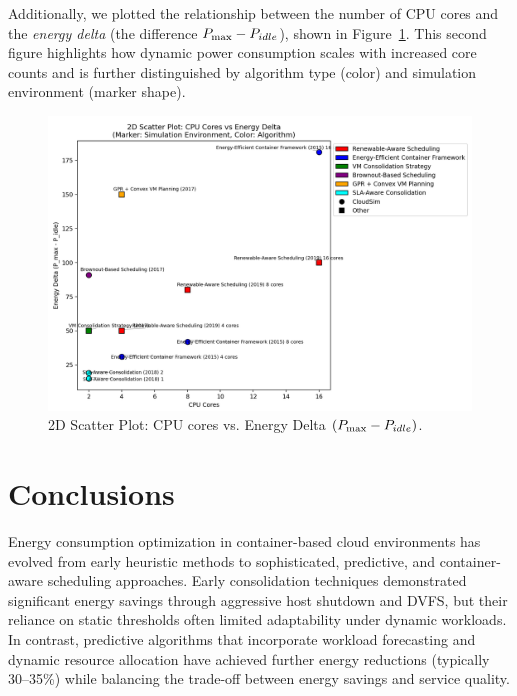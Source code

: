 \documentclass[runningheads]{llncs}
\begin{document}
Additionally, we plotted the relationship between the number of CPU cores and the \textit{energy delta} (the difference $P_{\max} - P_{\begin{footnotesize}idle \end{footnotesize}}$), shown in Figure~\ref{fig:energy_delta}. This second figure highlights how dynamic power consumption scales with increased core counts and is further distinguished by algorithm type (color) and simulation environment (marker shape).

\begin{figure}[H]
    \centering
    \includegraphics[width=0.75\columnwidth]{Energy.png}
    \caption{2D Scatter Plot: CPU cores vs. Energy Delta $(P_{\max} - P_{\begin{footnotesize}idle\end{footnotesize}})$.}
    \label{fig:energy_delta}
\end{figure}

\section{Conclusions}

Energy consumption optimization in container-based cloud environments has evolved from early heuristic methods to sophisticated, predictive, and container-aware scheduling approaches. Early consolidation techniques demonstrated significant energy savings through aggressive host shutdown and DVFS, but their reliance on static thresholds often limited adaptability under dynamic workloads\cite{carrega_energy-aware_2017}. In contrast, predictive algorithms that incorporate workload forecasting and dynamic resource allocation have achieved further energy reductions (typically 30--35\%) while balancing the trade-off between energy savings and service quality\cite{dabbagh_energy-efficient_2015,bui_energy_2017}.
\end{document}
